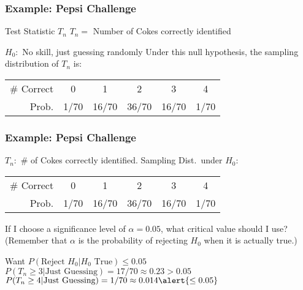 \documentclass{beamer}
\begin{document}
\begin{frame}
\frametitle{Example: Pepsi Challenge}
	\begin{block}{Test Statistic $T_n$}
		$T_n =$ Number of Cokes correctly identified
\end{block} 
	\begin{block}{$H_0\colon$ No skill, just guessing randomly}
	Under this null hypothesis, the sampling distribution of $T_n$ is:
		\begin{center}
		\begin{tabular}{rccccc}
		\hline
		\# Correct & 0 & 1 & 2 & 3 & 4\\
		Prob.&1/70 & 16/70 & 36/70 & 16/70 &1/70\\
		\hline
		\end{tabular}
	\end{center}
\end{block}


\end{frame}
\begin{frame}
\frametitle{Example: Pepsi Challenge }
$T_n\colon$ \# of Cokes correctly identified. Sampling Dist.\ under $H_0$:
		\begin{center}
		\begin{tabular}{rccccc}
		\hline
		\# Correct & 0 & 1 & 2 & 3 & 4\\
		Prob.&1/70 & 16/70 & 36/70 & 16/70 &1/70\\
		\hline
		\end{tabular}
	\end{center}
	\alert{If I choose a significance level of $\alpha =0.05$, what critical value should I use?}\\ (Remember that $\alpha$ is the probability of rejecting $H_0$ when it is actually true.)
	\pause
	
	\vspace{2em}
	Want $P(\mbox{Reject } H_0|H_0 \mbox{ True})\leq 0.05$\\ 
	$P(T_n \geq 3 |\mbox{Just Guessing}) = 17/70 \approx 0.23 > 0.05$ 
	$P(T_n \geq 4 |\mbox{Just Guessing}) = 1/70 \approx 0.014 \alert{\leq 0.05}$ 
\end{frame}
\end{document}
